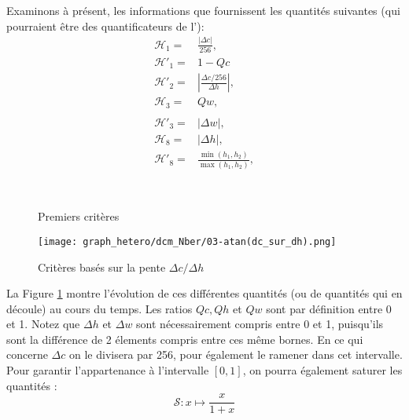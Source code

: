 \documentclass[main.tex]{subfiles}
\begin{document}
Examinons à présent, les informations que fournissent les quantités suivantes (qui pourraient être des quantificateurs de l'\hetero):
\begin{align}
\mathcal{H}_1 =& \frac{|\Delta c |}{256}, \\
\mathcal{H}'_1 =& 1-Qc \\ %
\mathcal{H}'_2 =& \left| \frac{\Delta c / 256 }{\Delta h}\right|, \\
\mathcal{H}_3 =& Qw, \\ %
\\
\mathcal{H}'_3 =& |\Delta w|, \\
\mathcal{H}_8 =& |\Delta h|, \\
\mathcal{H}'_8 =& \frac{ \min (h_1,h_2) }{ \max (h_1,h_2) },
\end{align}

\begin{figure}[htpb]
\\
\centering
{}
\caption{\label{fig:premiers_criteres}Premiers critères}
\end{figure}
\begin{figure}[htpb]
\centering
\texttt{[image: graph\_hetero/dcm\_Nber/03-atan(dc\_sur\_dh).png]}
\caption{\label{fig:critere_dc_sur_dh}Critères basés sur la pente $\Delta c / \Delta h$}
\end{figure}

La Figure \ref{fig:premiers_criteres} montre l'évolution de ces différentes quantités (ou de quantités qui en découle) au cours du temps. 
Les ratios $Qc, Qh$ et $Qw$ sont par définition entre 0 et 1. 
Notez que $\Delta h$ et $\Delta w$ sont nécessairement compris entre 0 et 1, puisqu'ils sont la différence de 2 élements compris entre ces même bornes. En ce qui concerne $\Delta c$ on le divisera par 256, pour également le ramener dans cet intervalle. Pour garantir l'appartenance à l'intervalle $[0,1]$, on pourra également saturer les quantités :
\begin{equation}
\label{eq:saturation_critere}
\mathscr{S}: x \longmapsto \dfrac{x}{1+x}
\end{equation}
\end{document}
